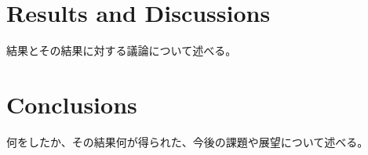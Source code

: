 \documentclass[a4paper,english,uplatex,dvipdfmx]{jsarticle}
\begin{document}
\section{Results and Discussions}
\label{sec:results}

結果とその結果に対する議論について述べる。

\section{Conclusions}
\label{sec:conclusions}

何をしたか、その結果何が得られた、今後の課題や展望について述べる。




\end{document}
